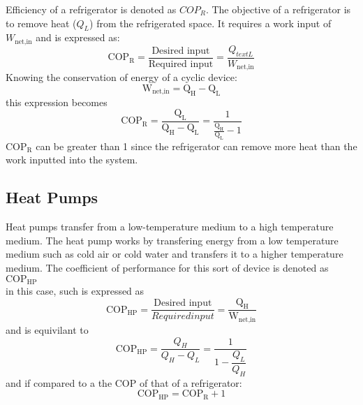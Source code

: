 \documentclass[14pt]{article}
\begin{document}
Efficiency of a refrigerator is denoted as $COP_R$. The objective of a refrigerator is to remove heat ($Q_L$) from the refrigerated space. It requires a work input of $W_{\text{net,in}}$ and is expressed as: \begin{equation}
   \text{COP}_{\text{R}} = \frac{\text{Desired input}}{\text{Required input}} = \frac{Q_{text{L}}}{W_{\text{net,in}}}
\end{equation}
Knowing the conservation of energy of a cyclic device:\begin{equation}
   \text{W}_{\text{net,in}} = \text{Q}_{\text{H}} - \text{Q}_{\text{L}}
\end{equation}
this expression becomes\begin{equation}
   \text{COP}_{\text{R}} = \frac{\text{Q}_{\text{L}}}{\text{Q}_{\text{H}} - \text{Q}_{\text{L}}} = \frac{1}{\frac{\text{Q}_{\text{H}}}{{\text{Q}_{\text{L}}}} - 1}
\end{equation}
$\text{COP}_{\text{R}}$ can be greater than 1 since the refrigerator can remove more heat than the work inputted into the system.
\subsection{Heat Pumps}
Heat pumps transfer from a low-temperature medium to a high temperature medium. The heat pump works by transfering energy from a low temperature medium such as cold air or cold water and transfers it to a higher temperature medium. The coefficient of performance for this sort of device is denoted as $\text{COP}_{\text{HP}}$
\\ in this case, such is expressed as \begin{equation}
   \text{COP}_{\text{HP}} = \dfrac{\text{Desired input}}{Required input} = \dfrac{\text{Q}_{\text{H}}}{\text{W}_{\text{net,in}}}
\end{equation}
and is equivilant to \begin{equation}
   \text{COP}_{\text{HP}} = \dfrac{Q_H}{Q_H - Q_L} = \dfrac{1}{1 - \dfrac{Q_L}{Q_H}}
\end{equation}
and if compared to a the COP of that of a refrigerator: \begin{equation}
   \text{COP}_{\text{HP}} = \text{COP}_{\text{R}} + 1
\end{equation}
\end{document}
